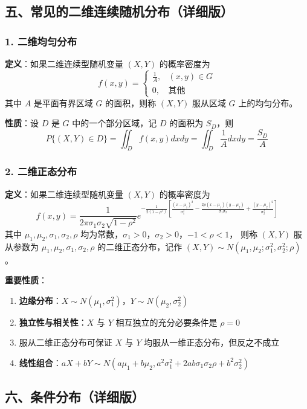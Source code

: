 \documentclass[12pt,a4paper]{ctexart}
\begin{document}
\subsection{五、常见的二维连续随机分布（详细版）}

\subsubsection{1. 二维均匀分布}
\textbf{定义}：如果二维连续型随机变量 $(X, Y)$ 的概率密度为
\[
    f(x, y) = \begin{cases} \frac{1}{A}, & (x, y) \in G \\ 0, & \text{其他} \end{cases}
\]
其中 $A$ 是平面有界区域 $G$ 的面积，则称 $(X, Y)$ 服从区域 $G$ 上的均匀分布。

\textbf{性质}：设 $D$ 是 $G$ 中的一个部分区域，记 $D$ 的面积为 $S_D$，则
\[
    P\{(X, Y) \in D\} = \iint_D f(x, y) dx dy = \iint_D \frac{1}{A} dx dy = \frac{S_D}{A}
\]

\subsubsection{2. 二维正态分布}
\textbf{定义}：如果二维连续型随机变量 $(X, Y)$ 的概率密度为
\[
    f(x, y) = \frac{1}{2\pi\sigma_1\sigma_2\sqrt{1-\rho^2}} e^{-\frac{1}{2(1-\rho^2)}\left[\frac{(x-\mu_1)^2}{\sigma_1^2} - \frac{2\rho(x-\mu_1)(y-\mu_2)}{\sigma_1\sigma_2} + \frac{(y-\mu_2)^2}{\sigma_2^2}\right]}
\]
其中 $\mu_1, \mu_2, \sigma_1, \sigma_2, \rho$ 均为常数，$\sigma_1 > 0$，$\sigma_2 > 0$，$-1 < \rho < 1$，
则称 $(X, Y)$ 服从参数为 $\mu_1, \mu_2, \sigma_1, \sigma_2, \rho$ 的二维正态分布，记作 $(X, Y) \sim N(\mu_1, \mu_2; \sigma_1^2, \sigma_2^2; \rho)$。

\textbf{重要性质}：
\begin{enumerate}[noitemsep]
    \item \textbf{边缘分布}：$X \sim N(\mu_1, \sigma_1^2)$，$Y \sim N(\mu_2, \sigma_2^2)$
    \item \textbf{独立性与相关性}：$X$ 与 $Y$ 相互独立的充分必要条件是 $\rho = 0$
    \item 服从二维正态分布可保证 $X$ 与 $Y$ 均服从一维正态分布，但反之不成立
    \item \textbf{线性组合}：$aX + bY \sim N(a\mu_1 + b\mu_2, a^2\sigma_1^2 + 2ab\sigma_1\sigma_2\rho + b^2\sigma_2^2)$
\end{enumerate}

\subsection{六、条件分布（详细版）}
\end{document}
